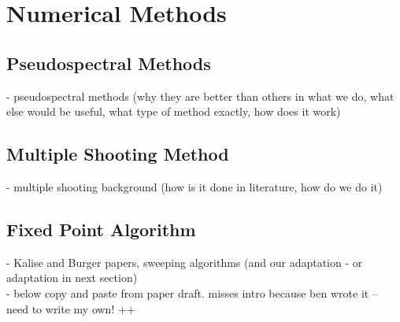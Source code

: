 \documentclass[11pt, a4paper]{article}
\theoremstyle{definition}
\begin{document}
\section{Numerical Methods}
\subsection{Pseudospectral Methods}
- pseudospectral methods (why they are better than others in what we do, what else would be useful, what type of method exactly, how does it work)
\subsection{Multiple Shooting Method}
- multiple shooting background (how is it done in literature, how do we do it)
\subsection{Fixed Point Algorithm}
- Kalise and Burger papers, sweeping algorithms (and our adaptation - or adaptation in next section)\\
- below copy and paste from paper draft. misses intro because ben wrote it -- need to write my own! ++
\end{document}
